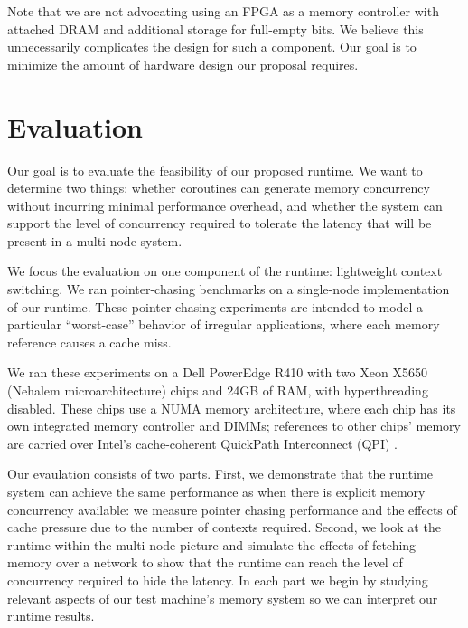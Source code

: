 \documentclass[10pt,nocopyrightspace,preprint]{sigplanconf}
\begin{document}
{Note that we are not advocating using an FPGA as a memory controller
with attached DRAM and additional storage for full-empty bits. We
believe this unnecessarily complicates the design for such a
component. Our goal is to minimize the amount of hardware design our
proposal requires.


\section{Evaluation}
\label{sec:evaluation}

Our goal is to evaluate the feasibility of our proposed runtime. We want to determine two things: whether coroutines can generate memory concurrency without incurring minimal performance overhead, and whether the system can support the level of concurrency required to tolerate the latency that will be present in a multi-node system.

We focus the evaluation on one component of the runtime: lightweight context switching. We ran pointer-chasing benchmarks on a single-node implementation of our runtime. These pointer chasing experiments are intended to model a particular ``worst-case'' behavior of irregular applications, where each memory reference causes a cache miss.

We ran these experiments on a Dell PowerEdge R410 with two Xeon X5650 (Nehalem microarchitecture)
chips and 24GB of RAM, with hyperthreading disabled. These
chips use a NUMA memory architecture, where each chip has
its own integrated memory controller and DIMMs; references to other
chips' memory are carried over Intel's cache-coherent QuickPath
Interconnect (QPI) \cite{quickpath:website}.

Our evaulation consists of two parts. First, we demonstrate that the runtime system can achieve the same performance as when there is explicit memory concurrency available: we measure pointer chasing performance and
the effects of cache pressure due to the number of contexts required. Second, we look at the runtime within the multi-node picture and simulate the effects of fetching memory over a network to show that the runtime can reach the level of concurrency required to hide the latency. In each part we begin by studying relevant aspects of our test machine's memory system so we can interpret our runtime results.


}
\end{document}
